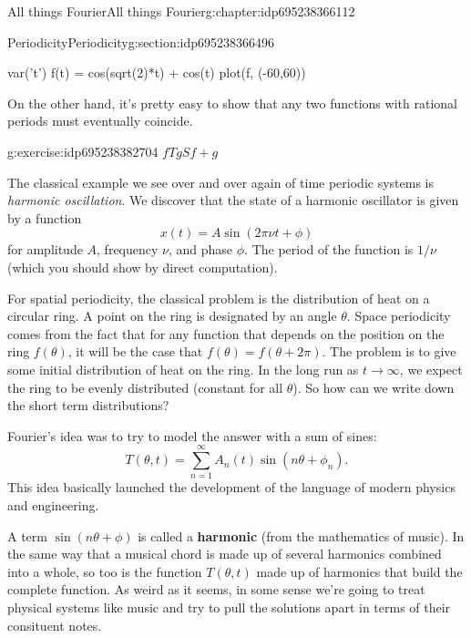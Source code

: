 \documentclass[oneside,10pt,]{book}
\newcommand{\terminology}[1]{\textbf{#1}}
\numberwithin{equation}{section}
\numberwithin{equation}{section}
\begin{document}
\begin{chapterptx}{All things Fourier}{}{All things Fourier}{}{}{g:chapter:idp695238366112}
\begin{sectionptx}{Periodicity}{}{Periodicity}{}{}{g:section:idp695238366496}
\begin{sageinput}
var('t')
f(t) = cos(sqrt(2)*t) + cos(t)
plot(f, (-60,60))
\end{sageinput}
On the other hand, it's pretty easy to show that any two functions with rational periods must eventually coincide.%
\begin{inlineexercise}{}{g:exercise:idp695238382704}%
\(f\)\(T\)\(g\)\(S\)\(f + g\)\end{inlineexercise}%
The classical example we see over and over again of time periodic systems is \emph{harmonic oscillation}. We discover that the state of a harmonic oscillator is given by a function%
\begin{equation*}
x(t) = A \sin(2 \pi \nu t + \phi)
\end{equation*}
for amplitude \(A\), frequency \(\nu\), and phase \(\phi\). The period of the function is \(1/\nu\) (which you should show by direct computation).%
\par
For spatial periodicity, the classical problem is the distribution of heat on a circular ring. A point on the ring is designated by an angle \(\theta\). Space periodicity comes from the fact that for any function that depends on the position on the ring \(f(\theta)\), it will be the case that \(f(\theta) = f(\theta + 2\pi)\). The problem is to give some initial distribution of heat on the ring. In the long run as \(t\to\infty\), we expect the ring to be evenly distributed (constant for all \(\theta\)). So how can we write down the short term distributions?%
\par
Fourier's idea was to try to model the answer with a sum of sines:%
\begin{equation*}
T(\theta, t) = \sum_{n=1}^\infty A_n(t) \sin(n \theta + \phi_n).
\end{equation*}
This idea basically launched the development of the language of modern physics and engineering.%
\par
A term \(\sin(n\theta + \phi)\) is called a \terminology{harmonic} (from the mathematics of music). In the same way that a musical chord is made up of several harmonics combined into a whole, so too is the function \(T(\theta,t)\) made up of harmonics that build the complete function. As weird as it seems, in some sense we're going to treat physical systems like music and try to pull the solutions apart in terms of their consituent notes.%
\end{sectionptx}
%
%
\typeout{************************************************}

\end{chapterptx}
\end{document}
